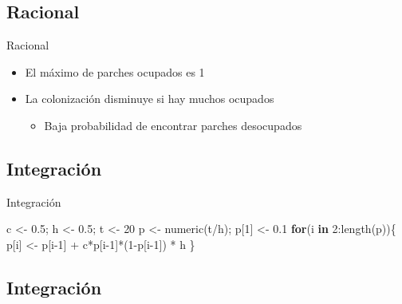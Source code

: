 \documentclass[
  11pt,
  ignorenonframetext,
]{beamer}
\newenvironment{Shaded}{}{}
\newcommand{\ControlFlowTok}[1]{\textcolor[rgb]{0.00,0.44,0.13}{\textbf{#1}}}
\newcommand{\DecValTok}[1]{\textcolor[rgb]{0.25,0.63,0.44}{#1}}
\newcommand{\FloatTok}[1]{\textcolor[rgb]{0.25,0.63,0.44}{#1}}
\newcommand{\FunctionTok}[1]{\textcolor[rgb]{0.02,0.16,0.49}{#1}}
\newcommand{\NormalTok}[1]{#1}
\newcommand{\OtherTok}[1]{\textcolor[rgb]{0.00,0.44,0.13}{#1}}
\newcommand{\SpecialCharTok}[1]{\textcolor[rgb]{0.25,0.44,0.63}{#1}}
\providecommand{\tightlist}{%
  \setlength{\itemsep}{0pt}\setlength{\parskip}{0pt}}
\begin{document}
\subsection{Racional}\label{racional}

\begin{frame}{Racional}
\begin{itemize}
\item
  El máximo de parches ocupados es 1
\item
  La colonización disminuye si hay muchos ocupados

  \begin{itemize}
  \tightlist
  \item
    Baja probabilidad de encontrar parches desocupados
  \end{itemize}
\end{itemize}
\end{frame}

\subsection{Integración}\label{integraciuxf3n}

\begin{frame}[fragile]{Integración}
\begin{Shaded}
\begin{Highlighting}[]
\NormalTok{c }\OtherTok{\textless{}{-}} \FloatTok{0.5}\NormalTok{; h }\OtherTok{\textless{}{-}} \FloatTok{0.5}\NormalTok{; t }\OtherTok{\textless{}{-}} \DecValTok{20}
\NormalTok{p }\OtherTok{\textless{}{-}} \FunctionTok{numeric}\NormalTok{(t}\SpecialCharTok{/}\NormalTok{h); p[}\DecValTok{1}\NormalTok{] }\OtherTok{\textless{}{-}} \FloatTok{0.1}
\ControlFlowTok{for}\NormalTok{(i }\ControlFlowTok{in} \DecValTok{2}\SpecialCharTok{:}\FunctionTok{length}\NormalTok{(p))\{}
\NormalTok{  p[i] }\OtherTok{\textless{}{-}}\NormalTok{ p[i}\DecValTok{{-}1}\NormalTok{] }\SpecialCharTok{+}\NormalTok{ c}\SpecialCharTok{*}\NormalTok{p[i}\DecValTok{{-}1}\NormalTok{]}\SpecialCharTok{*}\NormalTok{(}\DecValTok{1}\SpecialCharTok{{-}}\NormalTok{p[i}\DecValTok{{-}1}\NormalTok{]) }\SpecialCharTok{*}\NormalTok{ h}
\NormalTok{\}}
\end{Highlighting}
\end{Shaded}
\end{frame}

\subsection{Integración}\label{integraciuxf3n-1}
\end{document}
